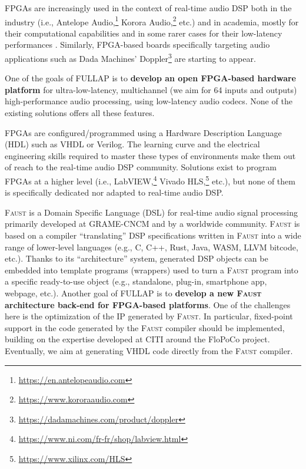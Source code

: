 \documentclass[a4paper,10pt]{article}
\newcommand{\F}{\textsc{Faust}}
\newcommand{\PP}{FULLAP}
\begin{document}
FPGAs are increasingly used in the context of real-time audio DSP both in the industry (i.e., Antelope Audio,\footnote{\url{https://en.antelopeaudio.com}} Korora Audio,\footnote{\url{https://www.kororaaudio.com}} etc.) and in academia, mostly for their computational capabilities \cite{Choi2013,Pfeifle2012} and in some rarer cases for their low-latency performances \cite{Verstraelen2014}. Similarly, FPGA-based boards specifically targeting audio applications such as Dada Machines' Doppler\footnote{\url{https://dadamachines.com/product/doppler}} are starting to appear. 

One of the goals of \PP{} is to \textbf{develop an open FPGA-based hardware platform} for ultra-low-latency, multichannel (we aim for 64 inputs and outputs) high-performance audio processing, using low-latency audio codecs.
None of the existing solutions offers all these features.



FPGAs are configured/programmed using a Hardware Description Language (HDL) such as VHDL or Verilog. The learning curve and the electrical engineering skills required to master these types of environments make them out of reach to the real-time audio DSP community. Solutions exist to program FPGAs at a higher level (i.e., LabVIEW,\footnote{\url{https://www.ni.com/fr-fr/shop/labview.html}} Vivado HLS,\footnote{\url{https://www.xilinx.com/HLS}} etc.), but none of them is specifically dedicated nor adapted to real-time audio DSP. 

\F{} \cite{Orlarey2009} is a Domain Specific Language (DSL) for real-time audio signal processing primarily developed at GRAME-CNCM and by a worldwide community. \F{} is based on a compiler ``translating'' DSP specifications written in \F{} into a wide range of lower-level languages (e.g., C, C++, Rust, Java, WASM, LLVM bitcode, etc.). Thanks to its ``architecture'' system, generated DSP objects can be embedded into template programs (wrappers) used to turn a \F{} program into a specific ready-to-use object (e.g., standalone, plug-in, smartphone app, webpage, etc.). Another goal of \PP{} is to \textbf{develop a new \F{} architecture back-end for FPGA-based platforms}.
One of the challenges here is the  optimization of the IP generated by \F{}. In particular, fixed-point support in the code generated by the \F{} compiler should be implemented, building on the expertise developed at CITI around the FloPoCo project. Eventually, we aim at generating VHDL code directly from the \F{} compiler. 
\end{document}
